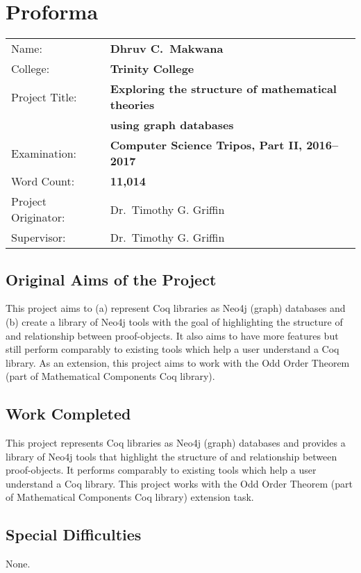 \chapter*{Proforma}

{%
\begin{tabular}{ll}
Name:               & \bf Dhruv C.\ Makwana \\
College:            & \bf Trinity College                     \\
Project Title:      & \bf Exploring the structure of mathematical theories \\
                    & \bf using graph databases \\
Examination:        & \bf Computer Science Tripos, Part II, 2016--2017 \\
Word Count:         & \bf 11,014 \\
Project Originator: & Dr.\ Timothy G. Griffin \\
Supervisor:         & Dr.\ Timothy G. Griffin \\
\end{tabular}
}

\section*{Original Aims of the Project}

This project aims to (a) represent Coq libraries as Neo4j (graph) databases and
(b) create a library of Neo4j tools with the goal of highlighting the structure
of and relationship between proof-objects.  It also aims to have more features
but still perform comparably to existing tools which help a user understand a
Coq library. As an extension, this project aims to work with the Odd Order
Theorem (part of Mathematical Components Coq library).

\section*{Work Completed}

This project represents Coq libraries as Neo4j (graph) databases and provides a
library of Neo4j tools that highlight the structure of and relationship between
proof-objects. It performs comparably to existing tools which help a user
understand a Coq library. This project works with the Odd Order Theorem (part
of Mathematical Components Coq library) extension task.

\section*{Special Difficulties}
None.

